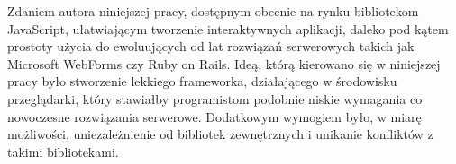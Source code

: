 Zdaniem autora niniejszej pracy, dostępnym obecnie na rynku bibliotekom JavaScript, ułatwiającym
tworzenie interaktywnych aplikacji, daleko pod kątem prostoty użycia do ewoluujących od lat
rozwiązań serwerowych takich jak Microsoft WebForms czy Ruby on Rails. Ideą, którą kierowano
się w niniejszej pracy było stworzenie lekkiego frameworka, działającego w środowisku przeglądarki,
który stawiałby programistom podobnie niskie wymagania co nowoczesne rozwiązania serwerowe.
Dodatkowym wymogiem było, w miarę możliwości, uniezależnienie od bibliotek zewnętrznych i
unikanie konfliktów z takimi bibliotekami.